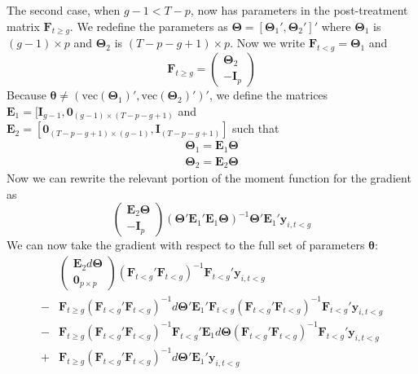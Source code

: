 \documentclass[12pt]{article}
\begin{document}
The second case, when $g - 1 < T-p$, now has parameters in the post-treatment matrix $\bm F_{t \geq g}$. We redefine the parameters as $\bm \Theta = [ \bm \Theta_1', \bm \Theta_2']'$ where $\bm \Theta_1$ is $(g-1) \times p$ and $\bm \Theta_2$ is $(T-p - g + 1) \times p$. Now we write $\bm F_{t < g} = \bm \Theta_1$ and 
\begin{equation}
    \bm F_{t \geq g} = 
    \begin{pmatrix}
        \bm \Theta_2\\
        - \bm I_p
    \end{pmatrix}
\end{equation}
Because $\bm \theta \neq (\text{vec}(\bm \Theta_1)', \text{vec}(\bm \Theta_2)')'$, we define the matrices $\bm E_1 = [\bm I_{g-1}, \bm 0_{(g-1) \times (T-p - g+1)}$ and $\bm E_2 = [ \bm 0_{(T-p - g + 1) \times (g-1)}, \bm I_{(T-p -g + 1)}]$ such that 
\begin{gather}
    \bm \Theta_1 = \bm E_1 \bm \Theta\\
    \bm \Theta_2 = \bm E_2 \bm \Theta
\end{gather}
Now we can rewrite the relevant portion of the moment function for the gradient as
\begin{equation}
    \begin{pmatrix}
        \bm E_2 \bm \Theta\\
        -\bm I_p
    \end{pmatrix}
    \left( \bm \Theta' \bm E_1' \bm E_1 \bm \Theta \right)^{-1} \bm \Theta' \bm E_1' \bm y_{i, t < g}
\end{equation} 
We can now take the gradient with respect to the full set of parameters $\bm \theta$:
\begin{align}
    & 
    \begin{pmatrix}
        \bm E_2 d \bm \Theta\\
        \bm 0_{p \times p}
    \end{pmatrix}
    \left( \bm F_{t < g}' \bm F_{t < g} \right)^{-1} \bm F_{t < g}' \bm y_{i, t < g}\label{case2_diff_eq1}\\
    - & 
    \bm F_{t \geq g} \left( \bm F_{t < g}' \bm F_{t < g} \right)^{-1} d \bm \Theta' \bm E_1' \bm F_{t < g} \left( \bm F_{t < g}' \bm F_{t < g} \right)^{-1} \bm F_{t < g}' \bm y_{i, t < g}\\
    - & \bm F_{t \geq g} \left( \bm F_{t < g}' \bm F_{t < g} \right)^{-1} \bm F_{t < g}' \bm E_1 d \bm \Theta \left( \bm F_{t < g}' \bm F_{t < g} \right)^{-1} \bm F_{t < g}' \bm y_{i, t < g}\\
    + & 
    \bm F_{t \geq g} \left( \bm F_{t < g}' \bm F_{t < g} \right)^{-1} d \bm \Theta' \bm E_1' \bm y_{i, t < g}
\end{align}
\end{document}
